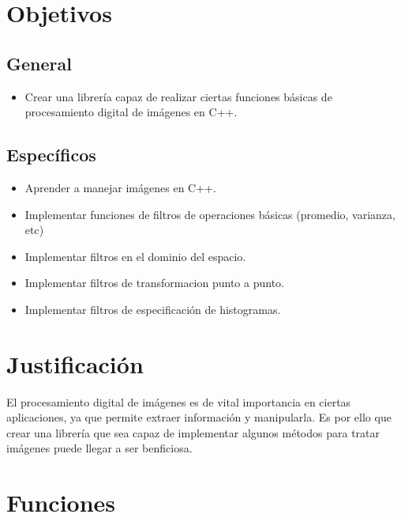 \documentclass[letterpaper]{article}
\begin{document}
\section{Objetivos}

	\subsection{General}

		\begin{itemize}

		\item Crear una librería capaz de realizar ciertas funciones básicas de procesamiento digital de imágenes en C++.

		\end{itemize}

	\subsection{Específicos}

		\begin{itemize}
     
        	\item{Aprender a manejar imágenes en C++.}

			\item{Implementar funciones de filtros de operaciones básicas (promedio, varianza, etc)}

			\item{Implementar filtros en el dominio del espacio.}
                        
            \item{Implementar filtros de transformacion punto a punto.}
            
            \item{Implementar filtros de especificación de histogramas.}

		\end{itemize}

\section{Justificación}

El procesamiento digital de imágenes es de vital importancia en ciertas aplicaciones, ya que permite extraer información y manipularla. Es por ello que crear una librería que sea capaz de implementar algunos métodos para tratar imágenes puede llegar a ser benficiosa.

\section{Funciones}
\end{document}
